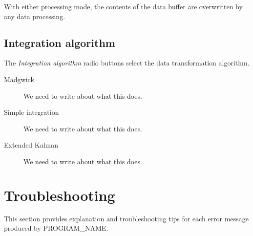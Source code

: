 \documentclass[11pt,letterpaper,article,oneside]{memoir}
\newcommand{\name}{PROGRAM\_NAME}
\begin{document}
With either processing mode, the contents of the data buffer are overwritten by
any data processing.

\section{Integration algorithm}

The \emph{Integration algorithm} radio buttons select the data transformation
algorithm.

\begin{description}

\item[Madgwick]
We need to write about what this does.
\item[Simple integration]
We need to write about what this does.
\item[Extended Kalman]
We need to write about what this does.

\end{description}





\chapter{Troubleshooting}

This section provides explanation and troubleshooting tips for each error
message produced by \name{}.
\end{document}
